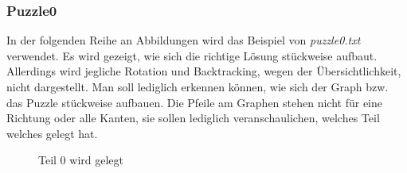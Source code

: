 \documentclass[a4paper, 12pt]{scrartcl}
\begin{document}
\subsubsection{Puzzle0}

In der folgenden Reihe an Abbildungen wird das Beispiel von \emph{puzzle0.txt} verwendet. Es wird gezeigt, wie sich die richtige Lösung stückweise aufbaut. Allerdings wird jegliche Rotation und Backtracking, wegen der Übersichtlichkeit, nicht dargestellt. Man soll lediglich erkennen können, wie sich der Graph bzw. das Puzzle stückweise aufbauen. Die Pfeile am Graphen stehen nicht für eine Richtung oder alle Kanten, sie sollen lediglich veranschaulichen, welches Teil welches gelegt hat.

\begin{figure}[h]
    \centering
    \begin{subfigure}[t]{0.45\textwidth}
        \centering
    \end{subfigure}
\hfill
    \begin{subfigure}[t]{0.45\textwidth}
    \centering

    \end{subfigure}
    \caption{Teil 0 wird gelegt}
\end{figure}
\end{document}
